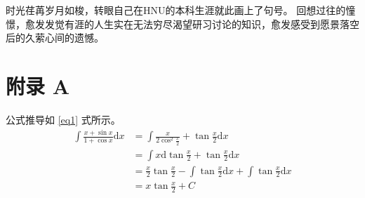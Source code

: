 \section*{\hfill \xiaoer{} \hfill}
    时光荏苒岁月如梭，转眼自己在HNU的本科生涯就此画上了句号。
    回想过往的憧憬，愈发发觉有涯的人生实在无法穷尽渴望研习讨论的知识，愈发感受到愿景落空后的久萦心间的遗憾。
    \clearpage

\section*{附录 A}
    公式推导如 \eqref{eq1} 式所示。
    \begin{equation}
        \begin{aligned}
            \int \frac{x+\sin x}{1 + \cos x} \mathrm{d} x &= \int \frac{x}{2\cos^2 \frac{x}{2}} + \tan \frac{x}{2} \mathrm{d} x \\
                &= \int x\mathrm{d}\tan \frac{x}{2} + \tan \frac{x}{2} \mathrm{d} x \\
                &= \frac{x}{2}\tan \frac{x}{2} - \int \tan \frac{x}{2} \mathrm{d} x + \int \tan \frac{x}{2} \mathrm{d} x \\
                &= x\tan \frac{x}{2} + C 
        \end{aligned}
        \label{eq1}
    \end{equation}
    
